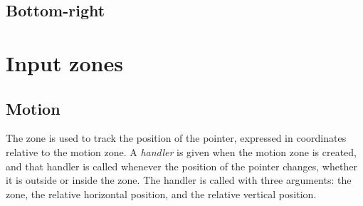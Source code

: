 \subsection{Bottom-right}



\section{Input zones}
\label{sec-zones-input}

\subsection{Motion}
\label{sec-zones-input-motion}

The  zone is used to track the position of the pointer,
expressed in coordinates relative to the motion zone.  A
\emph{handler} is given when the motion zone is created, and that
handler is called whenever the position of the pointer changes,
whether it is outside or inside the zone.  The handler is called with
three arguments: the zone, the relative horizontal position, and the
relative vertical position. 


